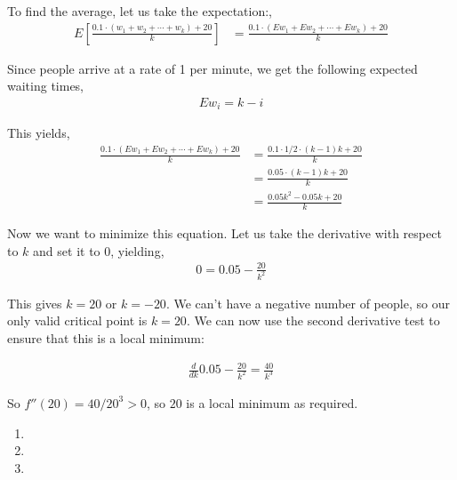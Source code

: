 \documentclass[12pt]{article}
\newenvironment{problem}[2][Problem]{\begin{trivlist}
\item[\hskip \labelsep {\bfseries #1}\hskip \labelsep {\bfseries #2.}]}{\end{trivlist}}
\begin{document}
To find the average, let us take the expectation:,
\begin{align*}
E \left[\frac{0.1 \cdot (w_1 + w_2 + \cdots + w_k) + 20}{k}\right] &= \frac{0.1 \cdot (Ew_1 + Ew_2 + \cdots + Ew_k) + 20}{k}
\end{align*}

Since people arrive at a rate of 1 per minute, we get the following expected waiting times,
\begin{align*}
Ew_i = k - i
\end{align*}

This yields,
\begin{align*}
\frac{0.1 \cdot (Ew_1 + Ew_2 + \cdots + Ew_k) + 20}{k} &= \frac{0.1 \cdot 1/2 \cdot (k-1)k + 20}{k}\\
&= \frac{0.05 \cdot (k-1)k + 20}{k}\\
&= \frac{0.05k^2 - 0.05k + 20}{k}
\end{align*}

Now we want to minimize this equation. Let us take the derivative with respect to $k$ and set it to $0$, yielding,
\begin{align*}
0 = 0.05 - \frac{20}{k^2}
\end{align*}

This gives $k = 20$ or $k = -20$. We can't have a negative number of people, so our only valid critical point is $k = 20$. We can now use the second derivative test to ensure that this is a local minimum:

\begin{align*}
\frac{d}{dk} 0.05 - \frac{20}{k^2} = \frac{40}{k^3}
\end{align*} 

So $f''(20) = 40/20^3 > 0$, so $20$ is a local minimum as required.

\begin{problem}{4}
\end{problem}

\begin{enumerate}[label=\Alph*)]

\item

\item

\item

\end{enumerate}
\end{document}
